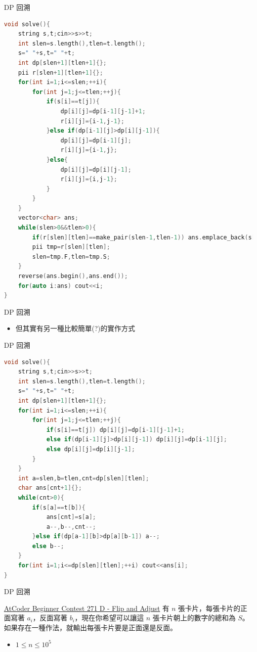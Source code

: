 \documentclass[aspectratio=169]{beamer}
\begin{document}
    \begin{frame}[fragile]{DP 回溯}
        \begin{lstlisting}[language=C++, basicstyle=\ttfamily\tiny]
void solve(){
    string s,t;cin>>s>>t;
    int slen=s.length(),tlen=t.length();
    s=" "+s,t=" "+t;
    int dp[slen+1][tlen+1]{};
    pii r[slen+1][tlen+1]{};
    for(int i=1;i<=slen;++i){
        for(int j=1;j<=tlen;++j){
            if(s[i]==t[j]){
                dp[i][j]=dp[i-1][j-1]+1;
                r[i][j]={i-1,j-1};
            }else if(dp[i-1][j]>dp[i][j-1]){
                dp[i][j]=dp[i-1][j];
                r[i][j]={i-1,j};
            }else{
                dp[i][j]=dp[i][j-1];
                r[i][j]={i,j-1};
            }
        }
    }
    vector<char> ans;
    while(slen>0&&tlen>0){
        if(r[slen][tlen]==make_pair(slen-1,tlen-1)) ans.emplace_back(s[slen]);
        pii tmp=r[slen][tlen];
        slen=tmp.F,tlen=tmp.S;
    }
    reverse(ans.begin(),ans.end());
    for(auto i:ans) cout<<i;
}
        \end{lstlisting}
    \end{frame}
    
    \begin{frame}{DP 回溯}
        \begin{itemize}
            \item 但其實有另一種比較簡單(?)的實作方式
        \end{itemize}
    \end{frame}
    
    \begin{frame}[fragile]{DP 回溯}
        \begin{lstlisting}[language=C++, basicstyle=\ttfamily\tiny]
void solve(){
    string s,t;cin>>s>>t;
    int slen=s.length(),tlen=t.length();
    s=" "+s,t=" "+t;
    int dp[slen+1][tlen+1]{};
    for(int i=1;i<=slen;++i){
        for(int j=1;j<=tlen;++j){
            if(s[i]==t[j]) dp[i][j]=dp[i-1][j-1]+1;
            else if(dp[i-1][j]>dp[i][j-1]) dp[i][j]=dp[i-1][j];
            else dp[i][j]=dp[i][j-1];
        }
    }
    int a=slen,b=tlen,cnt=dp[slen][tlen];
    char ans[cnt+1]{};
    while(cnt>0){
        if(s[a]==t[b]){
            ans[cnt]=s[a];
            a--,b--,cnt--;
        }else if(dp[a-1][b]>dp[a][b-1]) a--;
        else b--;
    }
    for(int i=1;i<=dp[slen][tlen];++i) cout<<ans[i];
}
        \end{lstlisting}
    \end{frame}
    
    \begin{frame}{DP 回溯}
        \begin{block}{\href{https://atcoder.jp/contests/abc271/tasks/abc271_d}{AtCoder Beginner Contest 271 D - Flip and Adjust}}
            有 $n$ 張卡片，每張卡片的正面寫著 $a_i$，反面寫著 $b_i$，現在你希望可以讓這 $n$ 張卡片朝上的數字的總和為 $S$。如果存在一種作法，就輸出每張卡片要是正面還是反面。
            \begin{itemize}
                \item $1 \le n \le 10^5$
            \end{itemize}
        \end{block}
    \end{frame}
\end{document}
